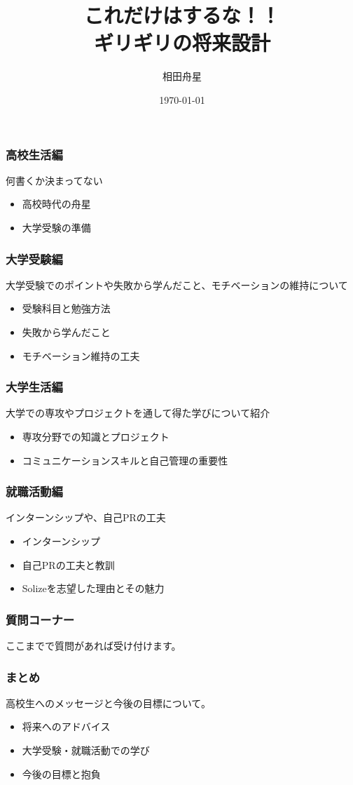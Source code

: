 \documentclass{beamer}
\title{これだけはするな！！\\ギリギリの将来設計}
\author{相田舟星}
\date{\today}
\begin{document}
\frame{\titlepage}

\begin{frame}
    \frametitle{高校生活編}
    何書くか決まってない
    \begin{itemize}
        \item 高校時代の舟星
        \item 大学受験の準備
    \end{itemize}
\end{frame}

\begin{frame}
    \frametitle{大学受験編}
    大学受験でのポイントや失敗から学んだこと、モチベーションの維持について
    \begin{itemize}
        \item 受験科目と勉強方法
        \item 失敗から学んだこと
        \item モチベーション維持の工夫
    \end{itemize}
\end{frame}

\begin{frame}
    \frametitle{大学生活編}
    大学での専攻やプロジェクトを通して得た学びについて紹介
    \begin{itemize}
        \item 専攻分野での知識とプロジェクト
        \item コミュニケーションスキルと自己管理の重要性
    \end{itemize}
\end{frame}

\begin{frame}
    \frametitle{就職活動編}
    インターンシップや、自己PRの工夫
    \begin{itemize}
        \item インターンシップ
        \item 自己PRの工夫と教訓
        \item Solizeを志望した理由とその魅力
    \end{itemize}
\end{frame}

\begin{frame}
    \frametitle{質問コーナー}
    ここまでで質問があれば受け付けます。
\end{frame}

\begin{frame}
    \frametitle{まとめ}
    高校生へのメッセージと今後の目標について。
    \begin{itemize}
        \item 将来へのアドバイス
        \item 大学受験・就職活動での学び
        \item 今後の目標と抱負
    \end{itemize}
\end{frame}
\end{document}
